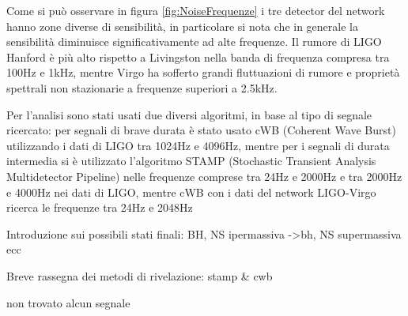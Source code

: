 Come si può osservare in figura \ref{fig:NoiseFrequenze} i tre detector del network hanno zone diverse di sensibilità, in particolare si nota che in generale la sensibilità diminuisce significativamente ad alte frequenze. Il rumore di LIGO Hanford è più alto rispetto a Livingston nella banda di frequenza compresa tra 100Hz e 1kHz, mentre Virgo ha sofferto grandi fluttuazioni di rumore e proprietà spettrali non stazionarie a frequenze superiori a 2.5kHz.

Per l'analisi sono stati usati due diversi algoritmi, in base al tipo di segnale ricercato: per segnali di brave durata è stato usato cWB (Coherent Wave Burst) utilizzando i dati di LIGO tra 1024Hz e 4096Hz, mentre per i segnali di durata intermedia si è utilizzato l'algoritmo STAMP (Stochastic Transient Analysis Multidetector Pipeline) nelle frequenze comprese tra 24Hz e 2000Hz e tra 2000Hz e 4000Hz nei dati di LIGO, mentre cWB con i dati del network LIGO-Virgo ricerca le frequenze tra 24Hz e 2048Hz

Introduzione sui possibili stati finali: BH, NS ipermassiva ->bh, NS supermassiva ecc

Breve rassegna dei metodi di rivelazione: stamp \& cwb

non trovato alcun segnale\cite{Abbott_2017a}